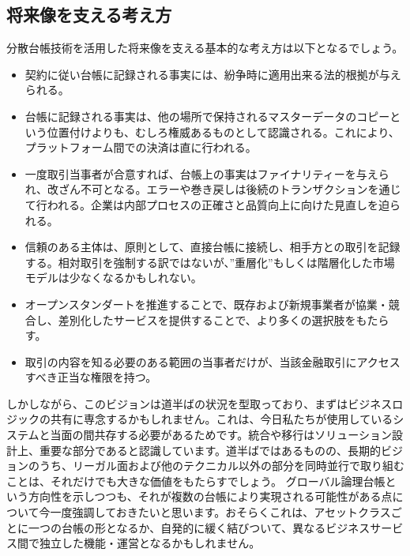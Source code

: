 \documentclass{article}
\begin{document}
\subsection{将来像を支える考え方}
分散台帳技術を活用した将来像を支える基本的な考え方は以下となるでしょう。
\begin{itemize}
	\item 契約に従い台帳に記録される事実には、紛争時に適用出来る法的根拠が与えられる。
	\item 台帳に記録される事実は、他の場所で保持されるマスターデータのコピーという位置付けよりも、むしろ権威あるものとして認識される。これにより、プラットフォーム間での決済は直に行われる。
	\item 一度取引当事者が合意すれば、台帳上の事実はファイナリティーを与えられ、改ざん不可となる。エラーや巻き戻しは後続のトランザクションを通じて行われる。企業は内部プロセスの正確さと品質向上に向けた見直しを迫られる。
	\item 信頼のある主体は、原則として、直接台帳に接続し、相手方との取引を記録する。相対取引を強制する訳ではないが、”重層化”もしくは階層化した市場モデルは少なくなるかもしれない。
	\item オープンスタンダートを推進することで、既存および新規事業者が協業・競合し、差別化したサービスを提供することで、より多くの選択肢をもたらす。
	\item 取引の内容を知る必要のある範囲の当事者だけが、当該金融取引にアクセスすべき正当な権限を持つ。
\end{itemize}
しかしながら、このビジョンは道半ばの状況を型取っており、まずはビジネスロジックの共有に専念するかもしれません。これは、今日私たちが使用しているシステムと当面の間共存する必要があるためです。統合や移行はソリューション設計上、重要な部分であると認識しています。道半ばではあるものの、長期的ビジョンのうち、リーガル面および他のテクニカル以外の部分を同時並行で取り組むことは、それだけでも大きな価値をもたらすでしょう。
グローバル論理台帳という方向性を示しつつも、それが複数の台帳により実現される可能性がある点について今一度強調しておきたいと思います。おそらくこれは、アセットクラスごとに一つの台帳の形となるか、自発的に緩く結びついて、異なるビジネスサービス間で独立した機能・運営となるかもしれません。
\end{document}
